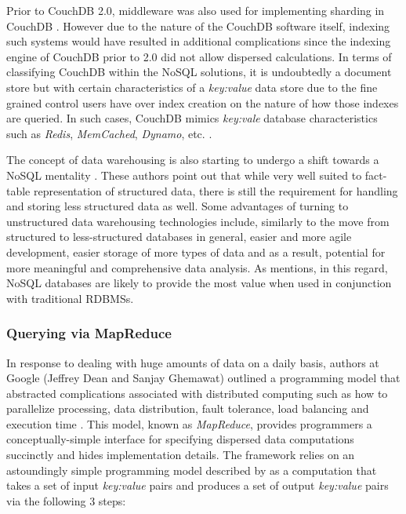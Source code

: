 Prior to CouchDB 2.0, middleware was also used for implementing sharding in CouchDB \cite{CORBELLINI20171}. However due to the nature of the CouchDB software itself, indexing such systems would have resulted in additional complications since the indexing engine of CouchDB prior to 2.0 did not allow dispersed calculations. In terms of classifying CouchDB within the NoSQL solutions, it is undoubtedly a document store but with certain characteristics of a \textit{key:value} data store due to the fine grained control users have over index creation on the nature of how those indexes are queried. In such cases, CouchDB mimics \textit{key:vale} database characteristics such as \textit{Redis}, \textit{MemCached}, \textit{Dynamo}, etc. \cite{MAKRIS201694,CORBELLINI20171,GANESHCHANDRA201513}.

The concept of data warehousing is also starting to undergo a shift towards a NoSQL mentality \cite{BICEVSKA2017104}. These authors point out that while very well suited to fact-table representation of structured data, there is still the requirement for handling and storing less structured data as well. Some advantages of turning to unstructured data warehousing technologies include, similarly to the move from structured to less-structured databases in general, easier and more agile development, easier storage of more types of data and as a result, potential for more meaningful and comprehensive data analysis. As \cite{BICEVSKA2017104} mentions, in this regard, NoSQL databases are likely to provide the most value when used in conjunction with traditional RDBMSs.

\subsubsection*{Querying via MapReduce}
In response to dealing with huge amounts of data on a daily basis, authors at Google (Jeffrey Dean and Sanjay Ghemawat) outlined a programming model that abstracted complications associated with distributed computing such as how to parallelize processing, data distribution, fault tolerance, load balancing and execution time \cite{Dean:2008}. This model, known as \textit{MapReduce}, provides programmers a conceptually-simple interface for specifying dispersed data computations succinctly and hides implementation details. The framework relies on an astoundingly simple programming model described by \cite{Dean:2008} as a computation that takes a set of input \textit{key:value} pairs and produces a set of output \textit{key:value} pairs via the following 3 steps:

